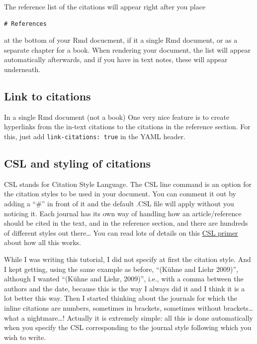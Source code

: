 \documentclass[]{book}
\theoremstyle{definition}
\theoremstyle{definition}
\theoremstyle{definition}
\theoremstyle{remark}
\begin{document}
The reference list of the citations will appear right after you place

\begin{verbatim}
# References
\end{verbatim}

at the bottom of your Rmd docucment, if it a single Rmd document, or as
a separate chapter for a book. When rendering your document, the list
will appear automatically afterwards, and if you have in text notes,
these will appear underneath.

\subsection{Link to citations}\label{link-to-citations}

In a single Rmd document (not a book) One very nice feature is to create
hyperlinks from the in-text citations to the citations in the reference
section. For this, just add \texttt{link-citations:\ true} in the YAML
header.

\subsection{CSL and styling of
citations}\label{csl-and-styling-of-citations}

CSL stands for Citation Style Language. The CSL line command is an
option for the citation styles to be used in your document. You can
comment it out by adding a ``\#'' in front of it and the default .CSL
file will apply without you noticing it. Each journal has its own way of
handling how an article/reference should be cited in the text, and in
the reference section, and there are hundreds of different styles out
there\ldots{} You can read lots of details on this
\href{http://docs.citationstyles.org/en/stable/primer.html}{CSL primer}
about how all this works.

While I was writing this tutorial, I did not specify at first the
citation style. And I kept getting, using the same example as before,
``(Kühne and Liehr 2009)'', although I wanted ``(Kühne and Liehr,
2009)'', i.e., with a comma between the authors and the date, because
this is the way I always did it and I think it is a lot better this way.
Then I started thinking about the journals for which the inline
citations are numbers, sometimes in brackets, sometimes without
brackets\ldots{} what a nightmare\ldots{}! Actually it is extremely
simple: all this is done automatically when you specify the CSL
corresponding to the journal style following which you wish to write.
\end{document}
